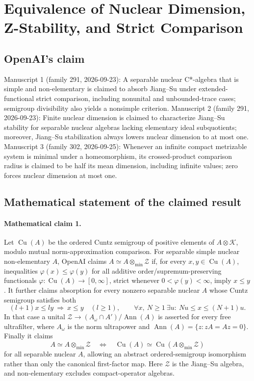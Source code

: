 \documentclass[11pt]{article}
\begin{document}
\section*{Equivalence of Nuclear Dimension, Z-Stability, and Strict Comparison}

\subsection{OpenAI's claim}
Manuscript 1 (family 291, 2026-09-23): A separable nuclear C*-algebra that is simple and non-elementary is claimed to absorb Jiang--Su under extended-functional strict comparison, including nonunital and unbounded-trace cases; semigroup divisibility also yields a nonsimple criterion. Manuscript 2 (family 291, 2026-09-23): Finite nuclear dimension is claimed to characterize Jiang--Su stability for separable nuclear algebras lacking elementary ideal subquotients; moreover, Jiang--Su stabilization always lowers nuclear dimension to at most one. Manuscript 3 (family 302, 2026-09-25): Whenever an infinite compact metrizable system is minimal under a homeomorphism, its crossed-product comparison radius is claimed to be half its mean dimension, including infinite values; zero forces nuclear dimension at most one.

\subsection{Mathematical statement of the claimed result}
\paragraph{Mathematical claim 1.} Let $\operatorname{Cu}(A)$ be the ordered Cuntz semigroup of positive elements of $A\otimes\mathcal K$, modulo mutual norm-approximation comparison. For separable simple nuclear non-elementary $A$, OpenAI claims $A\simeq A\otimes_{\min}\mathcal Z$ if, for every $x,y\in\operatorname{Cu}(A)$, inequalities $\varphi(x)\le\varphi(y)$ for all additive order/supremum-preserving functionals $\varphi:\operatorname{Cu}(A)\to[0,\infty]$, strict whenever $0<\varphi(y)<\infty$, imply $x\le y$.
It further claims absorption for every nonzero separable nuclear $A$ whose Cuntz semigroup satisfies both
\[
(l+1)x\le ly\ \Longrightarrow\ x\le y\quad(l\ge1),\qquad
\forall x,\ N\ge1\ \exists u:\ Nu\le x\le(N+1)u.
\]
In that case a unital $\mathcal Z\to (A_\omega\cap A')/\operatorname{Ann}(A)$ is asserted for every free ultrafilter, where $A_\omega$ is the norm ultrapower and $\operatorname{Ann}(A)=\{z:zA=Az=0\}$. Finally it claims
\[
A\simeq A\otimes_{\min}\mathcal Z\quad\Longleftrightarrow\quad
\operatorname{Cu}(A)\simeq\operatorname{Cu}(A\otimes_{\min}\mathcal Z)
\]
for all separable nuclear $A$, allowing an abstract ordered-semigroup isomorphism rather than only the canonical first-factor map. Here $\mathcal Z$ is the Jiang--Su algebra, and non-elementary excludes compact-operator algebras.
\end{document}
